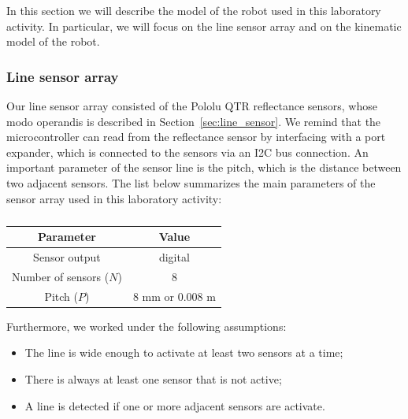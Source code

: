In this section we will describe the model of the robot used in this laboratory activity. In particular, we will focus on the line sensor array and on the kinematic model of the robot.

\subsubsection{Line sensor array}
Our line sensor array consisted of the Pololu QTR reflectance sensors, whose modo operandis is described in Section~\ref{sec:line_sensor}. 
We remind that the microcontroller can read from the reflectance sensor by interfacing with a port expander, which is connected to the sensors via an I2C bus connection.
An important parameter of the sensor line is the pitch, which is the distance between two adjacent sensors. The list below summarizes the main parameters of the sensor array used in this laboratory activity:
\begin{table}[H]
    \centering
    \begin{tabular}{cc}
        \toprule
        \textbf{Parameter} & \textbf{Value} \\
        \midrule
        Sensor output & digital \\
        Number of sensors ($N$) & 8 \\
        Pitch ($P$) & 8 mm or 0.008 m \\
        \bottomrule
    \end{tabular}
    \caption{}
\end{table}

Furthermore, we worked under the following assumptions:
\begin{itemize}
    \item The line is wide enough to activate at least two sensors at a time;
    \item There is always at least one sensor that is not active;
    \item A line is detected if one or more adjacent sensors are activate.
\end{itemize}

